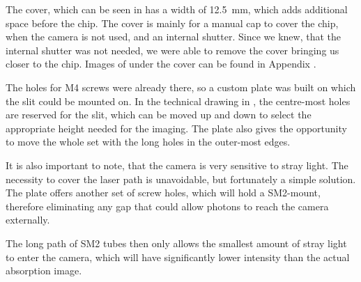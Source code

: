 The cover, which can be seen in  has a width of \SI{12.5}{\milli\meter}, which adds additional space before the chip. The cover is mainly for a manual cap to cover the chip, when the camera is not used, and an internal shutter. Since we knew, that the internal shutter was not needed, we were able to remove the cover bringing us closer to the chip. Images of under the cover can be found in Appendix .

The holes for M4 screws were already there, so a custom plate was built on which the slit could be mounted on.
In the technical drawing in , the centre-most holes are reserved for the slit, which can be moved up and down to select the appropriate height needed for the imaging.
The plate also gives the opportunity to move the whole set with the long holes in the outer-most edges.

It is also important to note, that the camera is very sensitive to stray light. The necessity to cover the laser path is unavoidable, but fortunately a simple solution. The plate offers another set of screw holes, which will hold a SM2-mount, therefore eliminating any gap that could allow photons to reach the camera externally.

The long path of SM2 tubes then only allows the smallest amount of stray light to enter the camera, which will have significantly lower intensity than the actual absorption image.